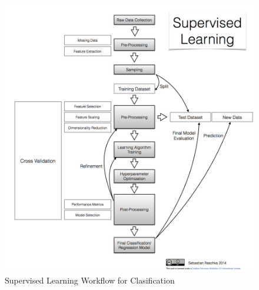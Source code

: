 \begin{figure}[!htbp]
  \centering
  \includegraphics[width=1\textwidth]{../img/supervised_learning_flowchart.png}
  \caption{Supervised Learning Workflow for Clasification}
\end{figure}
